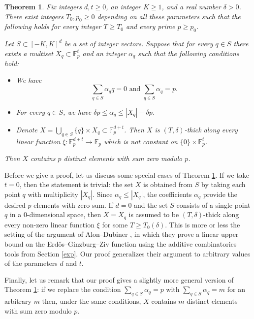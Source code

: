 \documentclass{daj}
\renewcommand{\le}{\leqslant}
\renewcommand{\ge}{\geqslant}
\newcommand{\FF}{\mathbb F}
\newtheorem{theorem}{Theorem}[section]
\theoremstyle{definition}
\theoremstyle{remark}
\theoremstyle{definition}
\theoremstyle{definition}
\begin{document}
\begin{theorem}\label{thexp}
    Fix integers $d, t \ge 0$, an integer $K \ge 1$, and a real number $\delta > 0$. There exist integers $T_0, p_0 \ge 0$ depending on all these parameters such that the following holds for every integer $T \ge T_0$ and every prime $p \ge p_0$. 

    Let $S \subset [-K, K]^d$ be a set of integer vectors. Suppose that for every $q \in S$ there exists a multiset $X_q \subset \FF_p^t$ and an integer $\alpha_q$ such that the following conditions hold:
    \begin{itemize}
        \item We have
    \[
    \sum_{q \in S} \alpha_q q = 0 \text{  and  } \sum_{q \in S} \alpha_q = p.
    \] 
    \item For every $q \in S$, we have $\delta p \le \alpha_q \le |X_q|-\delta p$.
    \item Denote $X = \bigcup_{q \in S} \{q\} \times X_q \subset \FF_p^{d+t}$. Then $X$ is $(T, \delta)$-thick along every linear function $\xi: \FF_p^{d+t} \rightarrow \FF_p$ which is not constant on $\{0\}\times \FF_p^t$.
    \end{itemize}

    Then $X$ contains $p$ distinct elements with sum zero modulo $p$.
\end{theorem}

Before we give a proof, let us discuss some special cases of Theorem \ref{thexp}. If we take $t=0$, then the statement is trivial: the set $X$ is obtained from $S$ by taking each point $q$ with multiplicity $|X_q|$. Since $\alpha_q \le |X_q|$, the coefficients $\alpha_q$ provide the desired $p$ elements with zero sum.
If $d = 0$ and the set $S$ consists of a single point $q$ in a 0-dimensional space, then $X = X_q$ is assumed to be $(T, \delta)$-thick along every non-zero linear function $\xi$ for some $T \ge T_0(\delta)$. This is more or less the setting of the argument of Alon--Dubiner \cite{AD}, in which they prove a linear upper bound on the Erd{\H o}s--Ginzburg--Ziv function using the additive combinatorics tools from Section \ref{exp}. Our proof generalizes their argument to arbitrary values of the parameters $d$ and $t$.

Finally, let us remark that our proof gives a slightly more general version of Theorem \ref{thexp}: if we replace the condition $\sum_{q\in S}\alpha_q = p$ with $\sum_{q\in S}\alpha_q = m$ for an arbitrary $m$ then, under the same conditions, $X$ contains $m$ distinct elements with sum zero modulo $p$.
\end{document}
